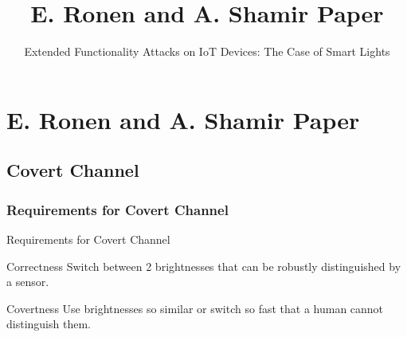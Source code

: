 \documentclass[11pt,t,usepdftitle=false,aspectratio=169]{beamer}
\begin{document}
\title{E. Ronen and A. Shamir Paper}
\subtitle{Extended Functionality Attacks on IoT Devices: The Case of Smart Lights}
\section{E. Ronen and A. Shamir Paper}

\subsection{Covert Channel}%
\label{sub:covert_channel}

\subsubsection{Requirements for Covert Channel}%
\label{sub:requirements_for_covert_channel}
\begin{frame}{Requirements for Covert Channel}
	\begin{block}{Correctness}
		Switch between 2 brightnesses that can be robustly distinguished by a sensor.
	\end{block}
	\begin{block}{Covertness}
		Use brightnesses so similar or switch so fast that a human cannot distinguish them.
	\end{block}
\end{frame}
\end{document}
